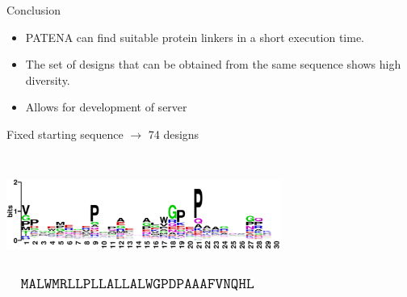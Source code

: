 \documentclass{beamer}
\begin{document}
\begin{frame}{Conclusion}
\begin{itemize}
 \item PATENA can find suitable protein linkers in a short execution time.
 \item The set of designs that can be obtained from the same sequence shows high diversity. 
 \item Allows for development of server
\end{itemize}
\end{frame}
























\begin{frame}
\centering
Fixed starting sequence $\rightarrow$ 74 designs\\
\begin{adjustwidth}{-1.5em}{-2.5em}
\includegraphics[width=340px,height=150px]{../img/logo.png}\\ 
\vspace{10px}
\hspace{18px}\includegraphics[width=325px,height=15px]{../img/sequence.png}
\end{adjustwidth}
\end{frame}
\end{document}
